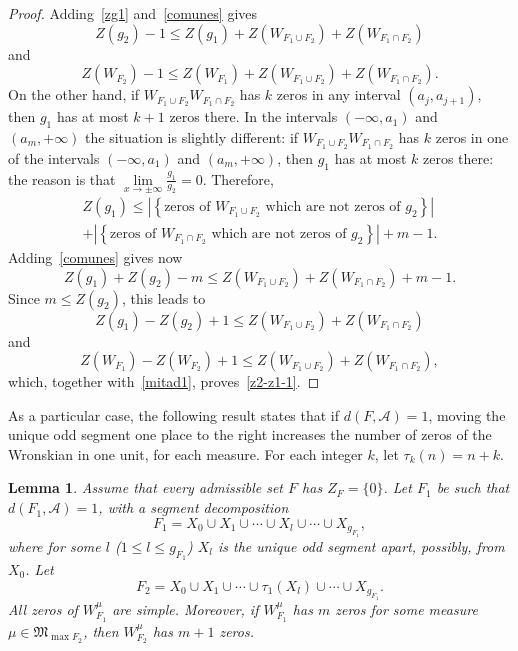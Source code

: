 \documentclass[10pt]{article}
\theoremstyle{plain}
\newtheorem{lemma}[theorem]{Lemma}
\theoremstyle{definition}
\numberwithin{equation}{section} %
\newcommand\Ad{\mathcal{A}}
\newcommand\M{\mathfrak{M}}
\begin{document}
\begin{proof}
Adding~\eqref{zg1} and~\eqref{comunes} gives
\[
   Z(g_2) - 1
   \leq Z(g_1) + Z(W_{F_1 \cup F_2}) + Z(W_{F_1 \cap F_2})
\]
and
\begin{equation}
\label{mitad1}
   Z(W_{F_2}) - 1
   \leq Z(W_{F_1}) + Z(W_{F_1 \cup F_2}) + Z(W_{F_1 \cap F_2}).
\end{equation}
On the other hand, if $W_{F_1 \cup F_2} W_{F_1 \cap F_2}$ has $k$ zeros in any interval $(a_j, a_{j+1})$, then $g_1$ has at most $k+1$ zeros there. In the intervals $(-\infty,a_1)$ and $(a_m,+\infty)$ the situation is slightly different: if $W_{F_1 \cup F_2} W_{F_1 \cap F_2}$ has $k$ zeros in one of the intervals $(-\infty,a_1)$ and $(a_m,+\infty)$, then $g_1$ has at most $k$ zeros there: the reason is that $\lim\limits_{x\to\pm\infty} \frac{g_1}{g_2} = 0$. Therefore,
\begin{multline*}
   Z(g_1) \leq
   \left| \left\{\text{zeros of }W_{F_1 \cup F_2}
   \text{ which are not zeros of } g_2 \right\} \right|
   \\
   +
   \left| \left\{\text{zeros of }W_{F_1 \cap F_2}
   \text{ which are not zeros of } g_2 \right\} \right|
   + m -1.
\end{multline*}
Adding~\eqref{comunes} gives now
\[
   Z(g_1) + Z(g_2) - m
   \leq Z(W_{F_1 \cup F_2}) + Z(W_{F_1 \cap F_2}) + m - 1.
\]
Since $m \leq Z(g_2)$, this leads to
\[
   Z(g_1) - Z(g_2) +1
   \leq Z(W_{F_1 \cup F_2}) + Z(W_{F_1 \cap F_2})
\]
and
\[
   Z(W_{F_1}) - Z(W_{F_2}) +1
   \leq Z(W_{F_1 \cup F_2}) + Z(W_{F_1 \cap F_2}),
\]
which, together with~\eqref{mitad1}, proves~\eqref{z2-z1-1}.
\end{proof}

As a particular case, the following result states that if $d(F,\Ad)=1$, moving the unique odd segment one place to the right increases the number of zeros of the Wronskian in one unit, for each measure. For each integer $k$, let $\tau_k(n) = n+k$.

\begin{lemma}\label{lp}
Assume that every admissible set $F$ has $Z_F = \{0\}$.
Let $F_1$ be such that $d(F_1,\Ad) =1$, with a segment decomposition
\[
   F_1 = X_0 \cup X_1 \cup \dotsb \cup X_l \cup \dotsb \cup X_{g_{F_1}},
\]
where for some $l$ ($1 \leq l \leq g_{F_1}$) $X_l$ is the unique odd segment apart, possibly, from $X_0$. Let
\[
   F_2 = X_0 \cup X_1 \cup \dotsb \cup \tau_1(X_l) \cup \dotsb \cup X_{g_{F_1}}.
\]
All zeros of $W_{F_1}^\mu$ are simple. Moreover, if $W_{F_1}^\mu$ has $m$ zeros for some measure $\mu \in \M_{\max F_2}$, then $W_{F_2}^\mu$ has $m+1$ zeros.
\end{lemma}
\end{document}
